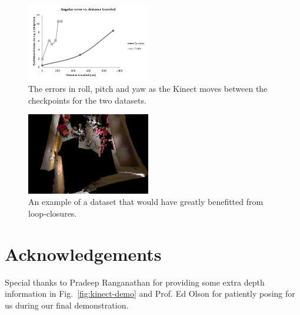 \documentclass[letterpaper, 10pt, conference]{ieeeconf}
\begin{document}
\begin{figure}[t]
\centering
\includegraphics[width=0.48\textwidth]{figures/gt_angular.pdf}
\caption{The errors in roll, pitch and yaw as the Kinect moves between the checkpoints
for the two datasets.}
\label{fig:plot-angular}
\end{figure}

\begin{figure}[t]
\centering
\includegraphics[width=0.48\textwidth]{figures/slam.png}
\caption{An example of a dataset that would have greatly benefitted from loop-closures.}
\label{fig:slam}
\end{figure}

\section*{Acknowledgements}
Special thanks to Pradeep Ranganathan for providing some extra depth
information in Fig.~\ref{fig:kinect-demo} and Prof. Ed Olson for patiently
posing for us during our final demonstration.



\end{document}
